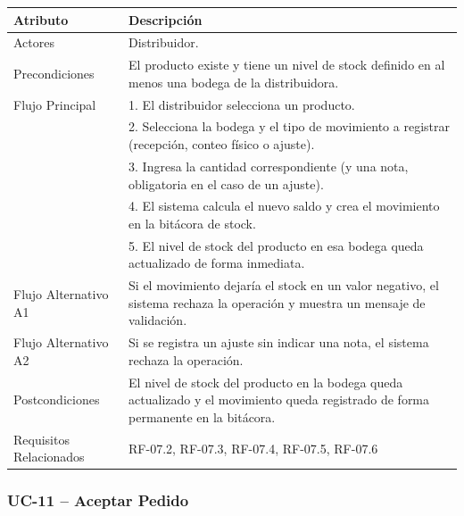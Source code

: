 \documentclass[12pt,a4paper]{report}
\begin{document}
\begin{longtable}{|p{4cm}|p{10cm}|}
\hline
\textbf{Atributo} & \textbf{Descripción} \\ \hline
Actores & Distribuidor. \\ \hline
Precondiciones & El producto existe y tiene un nivel de stock definido en al menos una bodega de la distribuidora. \\ \hline
Flujo Principal &
1. El distribuidor selecciona un producto.\\
& 2. Selecciona la bodega y el tipo de movimiento a registrar (recepción, conteo físico o ajuste).\\
& 3. Ingresa la cantidad correspondiente (y una nota, obligatoria en el caso de un ajuste).\\
& 4. El sistema calcula el nuevo saldo y crea el movimiento en la bitácora de stock.\\
& 5. El nivel de stock del producto en esa bodega queda actualizado de forma inmediata. \\ \hline
Flujo Alternativo A1 & Si el movimiento dejaría el stock en un valor negativo, el sistema rechaza la operación y muestra un mensaje de validación. \\ \hline
Flujo Alternativo A2 & Si se registra un ajuste sin indicar una nota, el sistema rechaza la operación. \\ \hline
Postcondiciones & El nivel de stock del producto en la bodega queda actualizado y el movimiento queda registrado de forma permanente en la bitácora. \\ \hline
Requisitos Relacionados & RF-07.2, RF-07.3, RF-07.4, RF-07.5, RF-07.6 \\ \hline
\end{longtable}
\subsubsection{UC-11 -- Aceptar Pedido}
\end{document}
